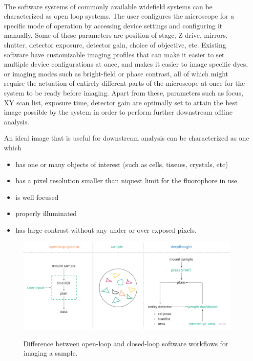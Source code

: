\paragraph*{}The software systems of commonly available widefield systems can be characterized as open loop systems. The user configures the microscope for a specific mode of operation by accessing device settings and configuring it manually. Some of these parameters are position of stage, Z drive, mirrors, shutter, detector exposure, detector gain, choice of objective, etc. Existing software have customizable imaging profiles that can make it easier to set multiple device configurations at once, and makes it easier to image specific dyes, or imaging modes such as bright-field or phase contrast, all of which might require the actuation of entirely different parts of the microscope at once for the system to be ready before imaging. Apart from these, parameters such as focus, XY scan list, exposure time, detector gain are optimally set to attain the best image possible by the system in order to perform further downstream offline analysis. 

An ideal image that is useful for downstream analysis can be characterized as one which
\begin{itemize}
\item has one or many objects of interest (such as cells, tissues, crystals, etc)
\item has a pixel resolution smaller than niquest limit for the fluorophore in use
\item is well focused
\item properly illuminated
\item has large contrast without any under or over exposed pixels.
\end{itemize}

\begin{figure}[H]
    {\hfill\includegraphics[width=1\linewidth]{figures/control_loop.jpg}\hspace*{\fill}}
    \caption{Difference between open-loop and closed-loop software workflows for imaging a sample.}
    {\label{fig:control_loop}}
\end{figure}



